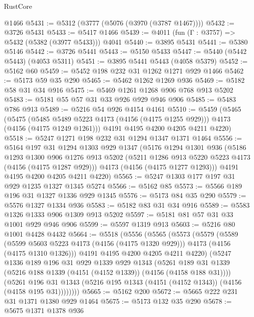 \begin{lexlean}{RustCore}
\begin{coremodule}
    @1466
@5431 := @5312 (@3777 (@5076 (@3970 (@3787 @1467))))
@5432 := @3726 @5431
@5433 := @5417 @1466
@5439 := @4011 (fun (Γ : @3757) => @5432 (@5382 (@3977 @5433))) @4041
@5440 := @3895 @5431
@5441 := @5380 @5146
@5442 := @3726 @5441
@5443 := @5150 @5433
@5447 := @5440 (@5442 @5443) (@4053 @5311)
@5451 := @3895 @5441 @5443 (@4058 @5379)
@5452 := @5162 @60
@5459 := @5452 @198 @232 @31 @1262 @1271 @929 @1466
@5462 := @5173 @59 @35 @290
@5465 := @5462 @1262 @1269 @936
@5469 := @5182 @58 @31 @34 @916
@5475 := @5469 @1261 @1268 @906 @768 @913 @5202
@5483 := @5181 @55 @57 @31 @33 @926 @929 @946 @906
@5485 := @5483 @786 @913
@5489 := @5216 @54 @926 @4154 @4161
@5510 := @5459
    (@5465
      (@5475 (@5485 @5489 @5223 @4173 (@4156 (@4175 @1255 @929))) @4173 (@4156 (@4175 @1249 @1261)))
      @4191
      @4195
      @4200
      @4205
      @4211
      @4220)
@5518 := @5247 @1271 @198 @232 @31 @1294 @1347 @1371 @1464
@5556 := @5164
    @197
    @31
    @1294
    @1303
    @929
    @1347
    (@5176
      @1294
      @1301
      @936
      (@5186
        @1293
        @1300
        @906
        @1276
        @913
        @5202
        (@5211 @1286 @913 @5220 @5223 @4173 (@4156 (@4175 @1287 @929)))
        @4173
        (@4156 (@4175 @1277 @1293)))
      @4191
      @4195
      @4200
      @4205
      @4211
      @4220)
@5565 := @5247 @1303 @177 @197 @31 @929 @1235 @1327 @1345 @5274
@5566 := @5162 @85
@5573 := @5566 @189 @196 @31 @1327 @1336 @929 @1345
@5576 := @5173 @84 @35 @290
@5579 := @5576 @1327 @1334 @936
@5583 := @5182 @83 @31 @34 @916
@5589 := @5583 @1326 @1333 @906 @1309 @913 @5202
@5597 := @5181 @81 @57 @31 @33 @1001 @929 @946 @906
@5599 := @5597 @1319 @913
@5603 := @5216 @80 @1001 @4428 @4432
@5664 := @5518
    (@5556
      (@5565
        (@5573
          (@5579
            (@5589
              (@5599 @5603 @5223 @4173 (@4156 (@4175 @1320 @929)))
              @4173
              (@4156 (@4175 @1310 @1326)))
            @4191
            @4195
            @4200
            @4205
            @4211
            @4220)
          (@5247
            @1336
            @189
            @196
            @31
            @929
            @1339
            @929
            @1343
            (@5261 @189 @31 @1339 (@5216 @188 @1339 (@4151 (@4152 @1339)) (@4156 (@4158 @188 @31))))
            (@5261
              @196
              @31
              @1343
              (@5216 @195 @1343 (@4151 (@4152 @1343)) (@4156 (@4158 @195 @31))))))))
@5665 := @5162 @200
@5672 := @5665 @222 @231 @31 @1371 @1380 @929 @1464
@5675 := @5173 @132 @35 @290
@5678 := @5675 @1371 @1378 @936

\end{coremodule}
\end{lexlean}
